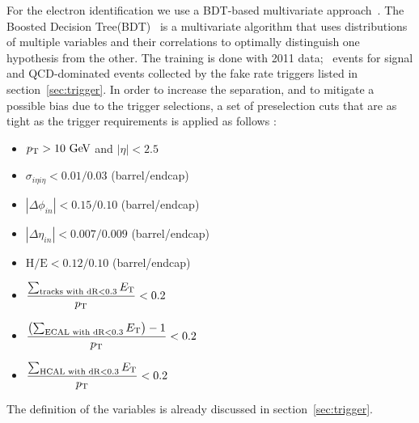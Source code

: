 For the electron identification we use a BDT-based multivariate 
approach~\cite{Chatrchyan:2012ufa}. The Boosted Decision Tree(BDT)~\cite{Hocker:2007ht} 
is a multivariate algorithm that uses distributions of multiple variables 
and their correlations to optimally distinguish one hypothesis from the other.  
The training is done with 2011 data; \dyll\ events for signal and QCD-dominated events 
collected by the fake rate triggers listed in section~\ref{sec:trigger}. 
In order to increase the separation, and to mitigate a possible bias 
due to the trigger selections, a set of preselection cuts that are as tight as the trigger 
requirements is applied as follows :  
\begin{itemize}
  \item $p_\mathrm{T}>10~\mathrm{Ge\kern -0.1em V}$ and $|\eta| < 2.5$
  \item $\sigma_{i\eta i\eta} < 0.01/0.03$ (barrel/endcap)
  \item $|\Delta\phi_{in}| < 0.15/0.10$ (barrel/endcap)
  \item $|\Delta\eta_{in}| < 0.007/0.009$ (barrel/endcap)
  \item $\textrm{H/E}< 0.12/0.10$ (barrel/endcap)
  \item $\displaystyle \frac{\sum_{\textrm{tracks with dR}<0.3}E_\mathrm{T}}{p_\mathrm{T}}<0.2$
  \item $\displaystyle \frac{\left(\sum_{\textrm{ECAL with dR}<0.3}E_\mathrm{T}\right)-1}{p_\mathrm{T}}<0.2$
  \item $\displaystyle \frac{\sum_{\textrm{HCAL with dR}<0.3}E_\mathrm{T}}{p_\mathrm{T}}<0.2$
\end{itemize}
The definition of the variables is already discussed in section~\ref{sec:trigger}. 

